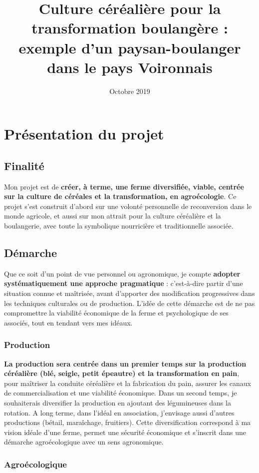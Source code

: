 \documentclass{article}
\title{Culture céréalière pour la transformation boulangère : exemple d'un paysan-boulanger dans le pays Voironnais}
\date{Octobre 2019}
\begin{document}
\section{Présentation du projet}

\subsection{Finalité}

Mon projet est de \textbf{créer, à terme, une ferme diversifiée, viable, centrée sur la culture de céréales et la transformation, en agroécologie}. Ce projet s'est construit d'abord sur une volonté personnelle de reconversion dans le monde agricole, et aussi sur mon attrait pour la culture céréalière et la boulangerie, avec toute la symbolique nourricière et traditionnelle associée. 

\subsection{Démarche}

Que ce soit d'un point de vue personnel ou agronomique, je compte \textbf{adopter systématiquement une approche pragmatique} : c'est-à-dire partir d'une situation connue et maîtrisée, avant d'apporter des modification progressives dans les techniques culturales ou de production. L'idée de cette démarche est de ne pas compromettre la viabilité économique de la ferme et psychologique de ses associés, tout en tendant vers mes idéaux.

\subsubsection*{Production}

\textbf{La production sera centrée dans un premier temps sur la production céréalière (blé, seigle, petit épeautre) et la transformation en pain}, pour maîtriser la conduite céréalière et la fabrication du pain, assurer les canaux de commercialisation et une viabilité économique. Dans un second temps, je souhaiterais diversifier la production en ajoutant des légumineuses dans la rotation. A long terme, dans l'idéal en association, j'envisage aussi d'autres productions (bétail, maraîchage, fruitiers). Cette diversification correspond à ma vision idéale d'une ferme, permet une sécurité économique et s'inscrit dans une démarche agroécologique avec un sens agronomique.

\subsubsection*{Agroécologique}
\end{document}
